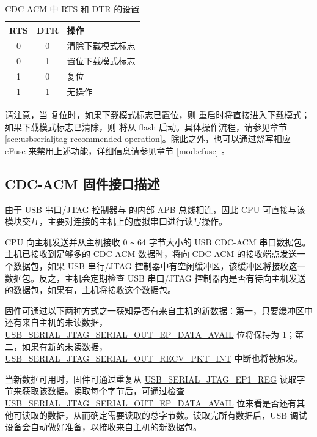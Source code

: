 \documentclass[main\_\_CN.tex]{subfiles}
\begin{document}
\begin{table}[H] 
    \centering
    \caption{CDC-ACM 中 RTS 和 DTR 的设置}
    \label{tab:usbserialjtag-cdc-acm-settings-with-rts-and-dtr}
    
    \begin{tabular}{ | c | c | p{5cm} | }
    \hline
        \rowcolor{lightgray}
        \textbf{RTS} & \textbf{DTR} & \textbf{操作}\\\hline
        
        0 & 0 & 清除下载模式标志 \\\hline
        0 & 1 & 置位下载模式标志  \\\hline
        1 & 0 & 复位 \chipname{}  \\\hline
        1 & 1 & 无操作 \\\hline
    \end{tabular}
\end{table}

请注意，当 \chipname{} 复位时，如果下载模式标志已置位，则 \chipname{} 重启时将直接进入下载模式；如果下载模式标志已清除，则 \chipname{} 将从 flash 启动。具体操作流程，请参见章节 \ref{sec:usbserialjtag-recommended-operation}。除此之外，也可以通过烧写相应 eFuse 来禁用上述功能，详细信息请参见章节 \ref{mod:efuse} \textit{}。

\subsection{CDC-ACM 固件接口描述}

由于 USB 串口/JTAG 控制器与 \chipname{} 的内部 APB 总线相连，因此 CPU 可直接与该模块交互，主要对连接的主机上的虚拟串口进行读写操作。

CPU 向主机发送并从主机接收 0 \verb+~+ 64 字节大小的 USB CDC-ACM 串口数据包。主机已接收到足够多的 CDC-ACM 数据时，将向 CDC-ACM 的接收端点发送一个数据包，如果 USB 串行/JTAG 控制器中有空闲缓冲区，该缓冲区将接收这一数据包。反之，主机会定期检查 USB 串口/JTAG 控制器内是否有待向主机发送的数据包，如果有，主机将接收这个数据包。

固件可通过以下两种方式之一获知是否有来自主机的新数据：第一，只要缓冲区中还有来自主机的未读数据，\hyperref[fielddesc:USBSERIALJTAGSERIALOUTEPDATAAVAIL]{USB\_SERIAL\_JTAG\_SERIAL\_OUT\_EP\_DATA\_AVAIL} 位将保持为 1；第二，如果有新的未读数据，\\\hyperref[fielddesc:USBSERIALJTAGSERIALOUTRECVPKTINTRAW]{USB\_SERIAL\_JTAG\_SERIAL\_OUT\_RECV\_PKT\_INT} 中断也将被触发。

当新数据可用时，固件可通过重复从 \hyperref[fielddesc:USBSERIALJTAGRDWRBYTE]{USB\_SERIAL\_JTAG\_EP1\_REG} 读取字节来获取该数据。读取每个字节后，可通过检查 \hyperref[fielddesc:USBSERIALJTAGSERIALOUTEPDATAAVAIL]{USB\_SERIAL\_JTAG\_SERIAL\_OUT\_EP\_DATA\_AVAIL} 位来看是否还有其他可读取的数据，从而确定需要读取的总字节数。读取完所有数据后，USB 调试设备会自动做好准备，以接收来自主机的新数据包。
\end{document}
